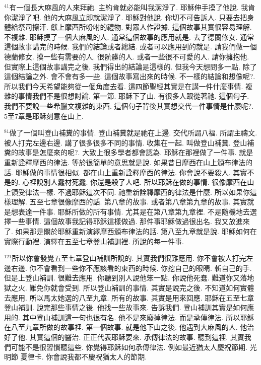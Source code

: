 \documentclass{book}
\begin{document}
$^{41}$有一個長大麻風的人來拜祂.
主約肯就必能叫我潔淨了.
耶穌伸手摸了他說.
我肯你潔淨了吧.
他的大麻風立即就潔淨了.
耶穌對他說.
你切不可告訴人.
只要去把身體給祭司擦汗.
獻上摩西所吩咐的禮物.
對眾人作證據.
這個故事其實很容易理解.
不複雜.
耶穌摸了一個大麻風的人.
通常這個故事的應用就是.
去了德蘭修女.
通常這個故事講完的時候.
我們的結論或者總結.
或者可以應用到的就是.
請我們做一個德蘭修女.
摸一些有需要的人.
很骯髒的人.
或者一些很不可愛的人.
請你擁抱他.
但實際上這個故事講完之後.
我們得出的結論是這樣的.
但我今天想問多一點.
除了這個結論之外.
會不會有多一些.
這個故事寫出來的時候.
不一樣的結論和想像呢?.
所以我們今天希望能夠從一個角度去看.
這四節聖經其實是在講一件什麼事情.
複雜的事情我們不是很想討論.
第一節.
耶穌下了山.
有很多人跟從著祂.
這個句子.
我們不要說一些希臘文複雜的東西.
這個句子背後其實想交代一件事情是什麼呢?.
5至7章是耶穌刻意在山上.

$^{81}$做了一個叫登山補糞的事情.
登山補糞就是祂在上邊.
交代所謂八福.
所謂主禱文.
被人打完左邊右邊.
講了很多很多不同的事情.
收集在一起.
叫做登山補糞.
登山補糞的故事是怎麼來的呢?.
大致上很多學者都會認為.
耶穌在那裡做了一件事.
就是重新詮釋摩西的律法.
等於很簡單的意思就是說.
如果昔日摩西在山上頒布律法的話.
耶穌做的事情很相似.
都在山上重新詮釋摩西的律法.
你會說不要殺人.
其實不是的.
心裡說別人蠢材死蠢.
你還是殺了人吧.
所以耶穌在做的事情.
很像摩西在山上領受律法一樣.
不過耶穌這次不同.
祂重新詮釋摩西的律法是什麼.
所以如果你這樣理解.
五至七章很像摩西的話.
第八章的故事.
或者第八章第九章的故事.
其實就是想表達一件事.
耶穌所做的所有事情.
尤其是在第八章第九章裡.
不是隨機地去選擇一些事情.
這個故事我記得耶穌這樣做過.
那件事耶穌做過很出名.
我又放進來了.
如果那是關於耶穌重新演繹摩西頒布律法的話.
第八至九章就是說.
耶穌如何在實際行動裡.
演繹在五至七章登山補訓裡.
所說的每一件事.

$^{121}$所以你會發覺五至七章登山補訓所說的.
其實我們很難應用.
你不會被人打完左邊右邊.
你不會看到一些你不應該看的東西的時候.
你挖自己的眼睛.
斬自己的手.
但是上登山補訓.
很難去應用.
你聽到別人說他笨一點.
你說他死蠢.
難道你又落地獄之火.
難免你就會受到.
所以登山補訓的事情.
其實是說完之後.
不知道如何實體去應用.
所以馬太她選的八至九章.
所有的故事.
其實是用來回應.
耶穌在五至七章登山補訓.
說完那些事情之後.
他找一些故事來.
告訴我們.
登山補訓其實是如何應用的.
其中登山補訓這一句也很有名.
他不是來廢掉律法.
而是承傳律法.
所以耶穌在八至九章所做的故事裡.
第一個故事.
就是他下山之後.
他遇到大麻風的人.
他治好了他.
其實這個的醫治.
正正代表耶穌要來.
承傳律法的故事.
聽到這裡.
其實我們可能不是很習慣聽這些.
你覺得耶穌如何承傳律法.
例如最近猶太人慶祝節期.
光明節 夏律卡.
你會說我都不慶祝猶太人的節期.
\end{document}
